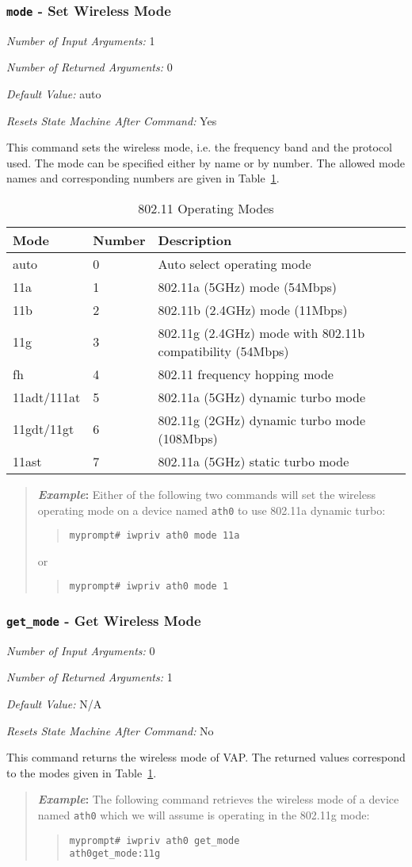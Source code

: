 \documentclass[10pt,fullpage]{article}
\newcommand{\mytt}[1]{{\texttt{#1}}}
\newcommand{\bv}{\begin{verse}}
\newcommand{\ev}{\end{verse}}
\newcommand{\cmd}[1]{{\texttt{myprompt\# #1}}}
\newcommand{\argdesc}[4]{\begin{description}
\itemsep -6pt
\item \textit{Number of Input Arguments:} #1
\item \textit{Number of Returned Arguments:} #2
\item \textit{Default Value:} #3
\item \textit{Resets State Machine After Command:} #4
\end{description}
}
\newenvironment{example}{\begin{quote}\textbf{\textit{Example}:}}{\end{quote}}
\begin{document}
\subsubsection{\mytt{mode} - Set Wireless Mode}
\argdesc{1}{0}{auto}{Yes}
This command sets the wireless mode, i.e. the frequency band and the
protocol used.  The mode can be specified either by name or by number. 
The allowed mode names and corresponding numbers are given in
Table~\ref{tab:mode}.
\begin{table}[h*]
  \centering
  \begin{tabular}{|l|l|l|} \hline
    Mode & Number & Description \\ \hline
    auto & 0 & Auto select operating mode \\
    11a & 1 & 802.11a (5GHz) mode (54Mbps) \\
    11b & 2 & 802.11b (2.4GHz) mode (11Mbps) \\
    11g & 3 & 802.11g (2.4GHz) mode with 802.11b compatibility (54Mbps) \\
    fh & 4 & 802.11 frequency hopping mode \\
    11adt/111at & 5 & 802.11a (5GHz) dynamic turbo mode \\
    11gdt/11gt & 6 & 802.11g (2GHz) dynamic turbo mode (108Mbps) \\
    11ast & 7 & 802.11a (5GHz) static turbo mode \\ \hline
  \end{tabular}
  \caption{802.11 Operating Modes}
  \label{tab:mode}
\end{table}
\begin{example}
  Either of the following two commands will set the wireless operating
  mode on a device named \mytt{ath0} to use 802.11a dynamic turbo:
  \bv
  \cmd{iwpriv ath0 mode 11a}
  \ev
  or
  \bv
  \cmd{iwpriv ath0 mode 1}
  \ev
\end{example}

\subsubsection{\mytt{get\_mode} - Get Wireless Mode}
\argdesc{0}{1}{N/A}{No}
This command returns the wireless mode of VAP.  The returned values
correspond to the modes given in Table~\ref{tab:mode}.
\begin{example}
  The following command retrieves the wireless mode of a device named
  \mytt{ath0} which we will assume is operating in the 802.11g mode:
  \bv
  \cmd{iwpriv ath0 get\_mode}\\
  \mytt{ath0\hspace{32pt}get\_mode:11g}
  \ev
\end{example}
\end{document}
